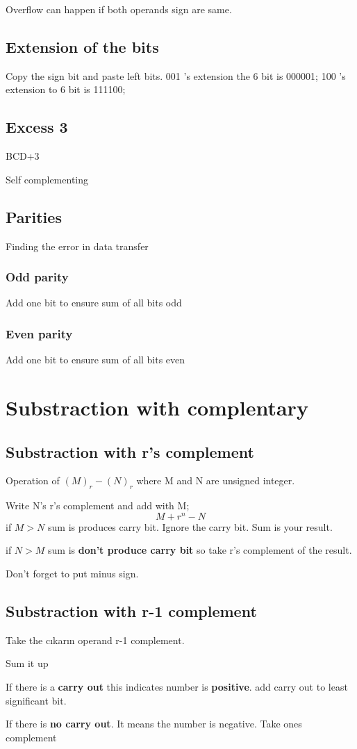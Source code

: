 \documentclass[11pt]{article}
\begin{document}
Overflow can happen if both operands sign are same.

\subsection*{Extension of the bits}

Copy the sign bit and paste left bits. 
001 's extension the 6 bit is 000001;
100 's extension to 6 bit is  111100;
\subsection*{Excess 3}
BCD+3

Self complementing

\subsection*{Parities}
Finding the error in data transfer
\subsubsection*{Odd parity}
Add one bit to ensure sum of all bits odd
\subsubsection*{Even parity}
Add one bit to ensure sum of all bits even

\section*{Substraction with complentary}
\subsection*{Substraction with r's complement}
Operation of $(M)_r-(N)_r$ where M and N are unsigned integer.

Write N's r's complement and add with M;
\[M+r^n-N\]
if $M>N$ sum is produces carry bit. Ignore the carry bit. Sum is your result.

if $N>M$ sum is \textbf{don't produce carry bit} so take r's complement of the result.

Don't forget to put minus sign.
\subsection*{Substraction with r-1 complement}
Take the cıkarın operand r-1 complement.

Sum it up 

If there is a \textbf{carry out} this indicates number is \textbf{positive}. add carry out to least significant bit. 

If there is \textbf{no carry out}. It means the number is negative. Take ones complement
\end{document}
